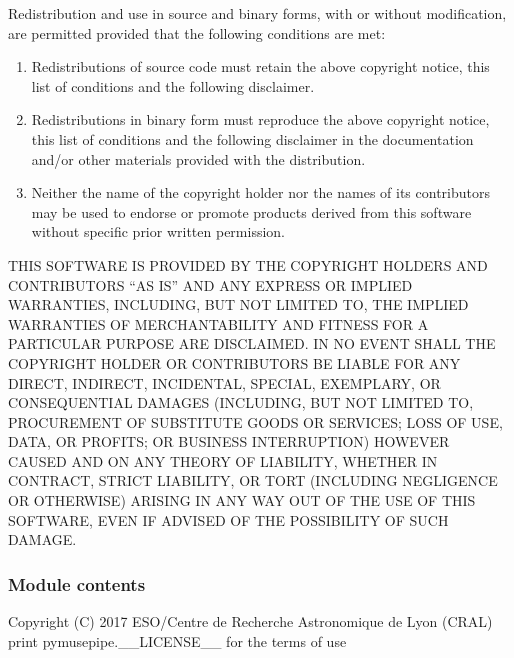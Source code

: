 \documentclass[letterpaper,10pt,english]{sphinxmanual}
\begin{document}
\sphinxAtStartPar
Redistribution and use in source and binary forms, with or without
modification, are permitted provided that the following conditions are met:
\begin{enumerate}
%
\item {} 
\sphinxAtStartPar
Redistributions of source code must retain the above copyright notice, this
list of conditions and the following disclaimer.

\item {} 
\sphinxAtStartPar
Redistributions in binary form must reproduce the above copyright notice,
this list of conditions and the following disclaimer in the documentation
and/or other materials provided with the distribution.

\item {} 
\sphinxAtStartPar
Neither the name of the copyright holder nor the names of its contributors
may be used to endorse or promote products derived from this software
without specific prior written permission.

\end{enumerate}

\sphinxAtStartPar
THIS SOFTWARE IS PROVIDED BY THE COPYRIGHT HOLDERS AND CONTRIBUTORS “AS IS” AND
ANY EXPRESS OR IMPLIED WARRANTIES, INCLUDING, BUT NOT LIMITED TO, THE IMPLIED
WARRANTIES OF MERCHANTABILITY AND FITNESS FOR A PARTICULAR PURPOSE ARE
DISCLAIMED. IN NO EVENT SHALL THE COPYRIGHT HOLDER OR CONTRIBUTORS BE LIABLE
FOR ANY DIRECT, INDIRECT, INCIDENTAL, SPECIAL, EXEMPLARY, OR CONSEQUENTIAL
DAMAGES (INCLUDING, BUT NOT LIMITED TO, PROCUREMENT OF SUBSTITUTE GOODS OR
SERVICES; LOSS OF USE, DATA, OR PROFITS; OR BUSINESS INTERRUPTION) HOWEVER
CAUSED AND ON ANY THEORY OF LIABILITY, WHETHER IN CONTRACT, STRICT LIABILITY,
OR TORT (INCLUDING NEGLIGENCE OR OTHERWISE) ARISING IN ANY WAY OUT OF THE USE
OF THIS SOFTWARE, EVEN IF ADVISED OF THE POSSIBILITY OF SUCH DAMAGE.


\subsubsection{Module contents}
\label{\detokenize{api/pymusepipe:module-pymusepipe}}\label{\detokenize{api/pymusepipe:module-contents}}
\sphinxAtStartPar
Copyright (C) 2017 ESO/Centre de Recherche Astronomique de Lyon (CRAL)
print pymusepipe.\_\_LICENSE\_\_  for the terms of use
\end{document}
